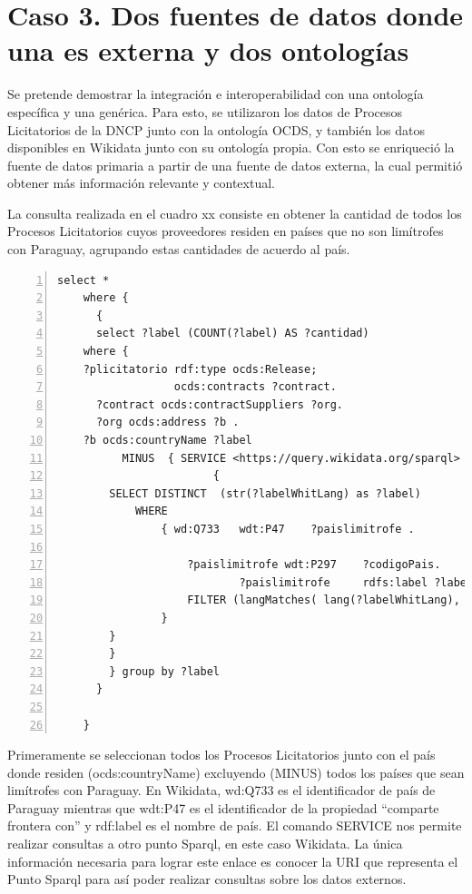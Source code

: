 \section{Caso 3. Dos fuentes de datos donde una es externa y dos ontologías}

Se pretende demostrar la integración e interoperabilidad con una ontología específica y una genérica. Para esto, se utilizaron los datos de Procesos Licitatorios de la DNCP junto con la ontología OCDS, y también los datos disponibles en Wikidata junto con su ontología propia. Con esto se enriqueció la fuente de datos primaria a partir de una fuente de datos externa, la cual permitió obtener más información relevante y contextual.

La consulta realizada en el cuadro xx consiste en obtener la cantidad de todos los Procesos Licitatorios cuyos proveedores residen en países que no son limítrofes con Paraguay, agrupando estas cantidades de acuerdo al país.


\begin{lstlisting}[captionpos=b, caption=Información referente al proceso licitatorio cuyo identificacor es, label=lst:caso1,  numbers=left,  numberstyle=\tiny\color{mygray},
    basicstyle=\ttfamily,frame=single]
select *
    where {
      {
      select ?label (COUNT(?label) AS ?cantidad)
    where {
    ?plicitatorio rdf:type ocds:Release;
                  ocds:contracts ?contract.
      ?contract ocds:contractSuppliers ?org.
      ?org ocds:address ?b .
    ?b ocds:countryName ?label
          MINUS  { SERVICE <https://query.wikidata.org/sparql>
                        { 
        SELECT DISTINCT  (str(?labelWhitLang) as ?label)
            WHERE
                { wd:Q733   wdt:P47    ?paislimitrofe .
                
                    ?paislimitrofe wdt:P297    ?codigoPais.
                            ?paislimitrofe     rdfs:label ?labelWhitLang. 
                    FILTER (langMatches( lang(?labelWhitLang), "ES" ) )
                }        
        }
        }
        } group by ?label
      }
    
    }
 \end{lstlisting}

 Primeramente se seleccionan todos los Procesos Licitatorios junto con el país donde residen (ocds:countryName) excluyendo (MINUS) todos los países que sean limítrofes con Paraguay. En Wikidata, wd:Q733 es el identificador de país de Paraguay mientras que wdt:P47 es el identificador de la propiedad “comparte frontera con” y rdf:label es el nombre de país. El comando SERVICE nos permite realizar consultas a otro punto Sparql, en este caso Wikidata. La única información necesaria para lograr este enlace es conocer la URI que representa el Punto Sparql para así poder realizar consultas sobre los datos externos.



